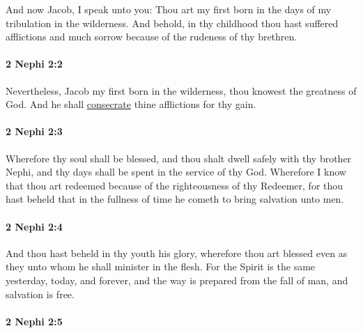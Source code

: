 			And now Jacob, I speak unto you:
			Thou art my first born in the days of my tribulation in the wilderness.
			And behold, in thy childhood thou hast suffered afflictions and much sorrow
			because of the rudeness of thy brethren.

		\paragraph{2 Nephi 2:2} %
			\label{2NEPHI-2-2}

			Nevertheless, Jacob my first born in the wilderness,
			thou knowest the greatness of God.
			And he shall \hyperref[CONSECRATION]{consecrate} thine afflictions for thy gain.

		\paragraph{2 Nephi 2:3} %
			\label{2NEPHI-2-3}

			Wherefore thy soul shall be blessed,
			and thou shalt dwell safely with thy brother Nephi,
			and thy days shall be spent in the service of thy God.
			Wherefore I know that thou art redeemed
			because of the righteousness of thy Redeemer,
			for thou hast beheld that in the fullness of time
			he cometh to bring salvation unto men.

		\paragraph{2 Nephi 2:4} %
			\label{2NEPHI-2-4}

			And thou hast beheld in thy youth his glory,
			wherefore thou art blessed
			even as they unto whom he shall minister in the flesh.
			For the Spirit is the same yesterday, today, and forever,
			and the way is prepared from the fall of man,
			and salvation is free.

		\paragraph{2 Nephi 2:5} %
			\label{2NEPHI-2-5}


